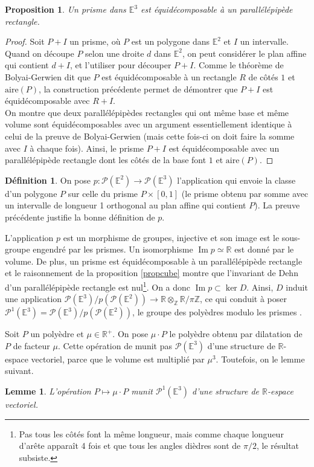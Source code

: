 \documentclass{article}
\newcommand{\Z}{\mathbb{Z}}
\newcommand{\R}{\mathbb{R}}
\newcommand{\E}{\mathbb{E}}
\renewcommand{\P}{\mathcal{P}}
\renewcommand{\Im}{\mathop{\mathrm{Im}}}
\theoremstyle{plain}
\newtheorem{proposition}[theorem]{Proposition}
\newtheorem{lemma}[theorem]{Lemme}
\theoremstyle{definition}
\newtheorem{definition}[theorem]{Définition}
\theoremstyle{remark}
\begin{document}
\begin{proposition}
    Un prisme dans $\E^3$ est équidécomposable à un parallélépipède rectangle.
\end{proposition}

\begin{proof}
    Soit $P + I$ un prisme, où $P$ est un polygone dans $\E^2$ et $I$ un intervalle. Quand on découpe $P$ selon une droite $d$ dans $\E^2$, on peut considérer le plan affine qui contient $d + I$, et l'utiliser pour découper $P+I$. Comme le théorème de Bolyai-Gerwien dit que $P$ est équidécomposable à un rectangle $R$ de côtés $1$ et $\mathrm{aire}(P)$, la construction précédente permet de démontrer que $P+I$ est équidécomposable avec $R + I$. \\
    On montre que deux parallélépipèdes rectangles qui ont même base et même volume sont équidécomposables avec un argument essentiellement identique à celui de la preuve de Bolyai-Gerwien (mais cette fois-ci on doit faire la somme avec $I$ à chaque fois). Ainsi, le prisme $P+I$ est équidécomposable avec un parallélépipède rectangle dont les côtés de la base font $1$ et $\mathrm{aire}(P)$.
\end{proof}

\begin{definition}
    On pose $p : \P(\E^2) \to \P(\E^3)$ l'application qui envoie la classe d'un polygone $P$ sur celle du prisme $P\times [0,1]$ (le prisme obtenu par somme avec un intervalle de longueur 1 orthogonal au plan affine qui contient $P$). La preuve précédente justifie la bonne définition de $p$.
\end{definition} 

L'application $p$ est un morphisme de groupes, injective et son image est le sous-groupe engendré par les prismes. Un isomorphisme $\Im p \simeq \R$ est donné par le volume. De plus, un prisme est équidécomposable à un parallélépipède rectangle et le raisonnement de la proposition \ref{propcube} montre que l'invariant de Dehn d'un parallélépipède rectangle est nul\footnote{Pas tous les côtés font la même longueur, mais comme chaque longueur d'arête apparaît 4 fois et que tous les angles dièdres sont de $\pi/2$, le résultat subsiste.}. On a donc $\Im p \subset \ker D$. Ainsi, $D$ induit une application $\P(\E^3)/p(\P(\E^2)) \to \R \otimes_\Z \R/\pi\Z$, ce qui conduit à poser $\P^1(\E^3) = \P(\E^3)/p(\P(\E^2))$, le groupe des \og polyèdres modulo les prismes \fg.

Soit $P$ un polyèdre et $\mu \in \R^+$. On pose $\mu \cdot P$ le polyèdre obtenu par dilatation de $P$ de facteur $\mu$. Cette opération de munit pas $\P(\E^3)$ d'une structure de $\R$-espace vectoriel, parce que le volume est multiplié par $\mu^3$. Toutefois, on le lemme suivant.
\begin{lemma}
    L'opération $P \mapsto \mu \cdot P$ munit $\P^1(\E^3)$ d'une structure de $\R$-espace vectoriel.
\end{lemma}
\end{document}
